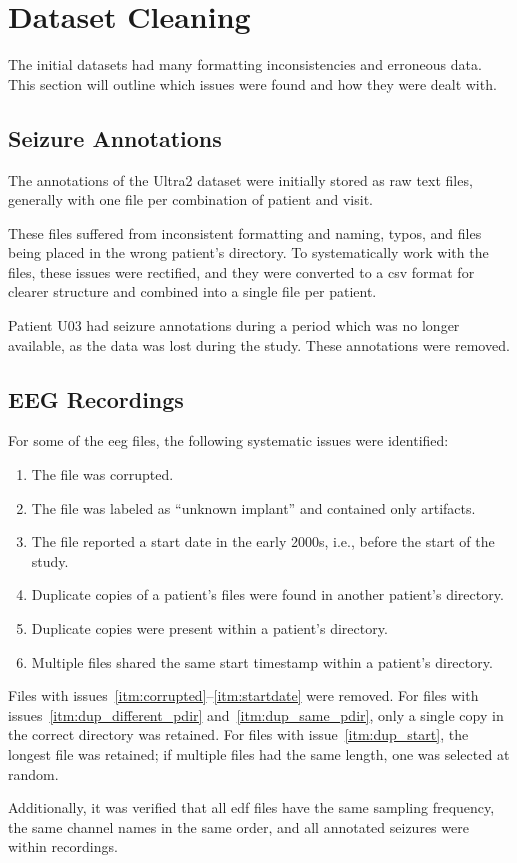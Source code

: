 \section{Dataset Cleaning}\label{sec:dataset-cleaning}
The initial datasets had many formatting inconsistencies and erroneous data.
This section will outline which issues were found and how they were dealt with.

\subsection{Seizure Annotations}\label{subsec:seizure-annotations}
The annotations of the Ultra2 dataset were initially stored as raw text files, generally with one file per combination of patient and visit.  %

These files suffered from inconsistent formatting and naming, typos, and files being placed in the wrong patient's directory.
To systematically work with the files, these issues were rectified, and they were converted to a \gls{csv} format for clearer structure and combined into a single file per patient.

Patient U03 had seizure annotations during a period which was no longer available, as the data was lost during the study.
These annotations were removed.

\subsection{EEG Recordings}\label{subsec:eeg-recordings}

For some of the \gls{eeg} files, the following systematic issues were identified:
\begin{enumerate}
    \item \label{itm:corrupted} The file was corrupted.
    \item \label{itm:unknown} The file was labeled as ``unknown implant'' and contained only artifacts.
    \item \label{itm:startdate} The file reported a start date in the early 2000s, i.e., before the start of the study.
    \item \label{itm:dup_different_pdir} Duplicate copies of a patient's files were found in another patient's directory.
    \item \label{itm:dup_same_pdir} Duplicate copies were present within a patient's directory.
    \item \label{itm:dup_start} Multiple files shared the same start timestamp within a patient's directory.
\end{enumerate}

Files with issues~\ref{itm:corrupted}--\ref{itm:startdate} were removed.
For files with issues~\ref{itm:dup_different_pdir} and~\ref{itm:dup_same_pdir}, only a single copy in the correct directory was retained.
For files with issue~\ref{itm:dup_start}, the longest file was retained; if multiple files had the same length, one was selected at random.

Additionally, it was verified that all \gls{edf} files have the same sampling frequency, the same channel names in the same order, and all annotated seizures were within recordings.

